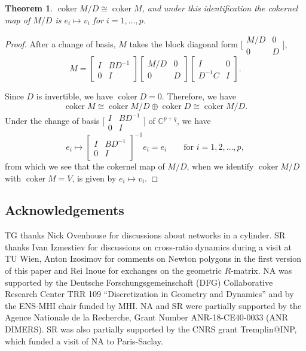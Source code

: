 \documentclass[pdftex]{sigma}
\numberwithin{equation}{section}
\newtheorem{Theorem}{Theorem}[section]
\newcommand{\C}{{\mathbb C}}
\newcommand{\la}{\label}
\DeclareMathOperator{\coker}{coker}
\begin{document}
		\begin{Theorem}\la{thm::schur}
			$\coker M/D \cong \coker M$, and under this identification the cokernel map of $M/D$ is $e_i \mapsto v_i$ for $i=1,\dots,p$.
		\end{Theorem}
		\begin{proof}
			After a change of basis, $M$ takes the block diagonal form $\bigl[\begin{smallmatrix} M/D &0\\ 0&D \end{smallmatrix}\bigr]$,
			\[
			M=\begin{bmatrix}
				I & B D^{-1}\\
				0 & I
			\end{bmatrix}
			\begin{bmatrix} M/D &0\\ 0&D \end{bmatrix}
			\begin{bmatrix}
				I & 0\\
				D^{-1}C & I
			\end{bmatrix}.
			\]
			
			Since $D$ is invertible, we have $\coker D=0$. Therefore, we have
			\[
			\coker M \cong \coker M/D \oplus \coker D \cong \coker M/D.
			\]
			Under the change of basis $\big[\begin{smallmatrix}
				I & B D^{-1}\\
				0 & I
			\end{smallmatrix}\bigr]$ of $\C^{p+q}$, we have
			\[
			e_i \mapsto \begin{bmatrix}
				I & B D^{-1}\\
				0 & I
			\end{bmatrix}^{-1} e_i = e_i\qquad \text{for }i =1,2,\dots,p,
			\]
			from which we see that the cokernel map of $M/D$, when we identify $\coker M/D$ with ${\coker M\!=\!V}$, is given by $e_i \mapsto v_i$.
		\end{proof}


\subsection*{Acknowledgements}

TG thanks Nick Ovenhouse for discussions about networks in a cylinder. SR thanks Ivan Izmestiev for discussions on cross-ratio dynamics during a visit at TU Wien, Anton Izosimov for comments on Newton polygons in the first version of this paper and Rei Inoue for exchanges on the geometric $R$-matrix. NA was supported by the Deutsche Forschungsgemeinschaft (DFG) Collaborative Research Center TRR 109 ``Discretization in Geometry and Dynamics'' and by the ENS-MHI chair funded by MHI. NA and SR were partially supported by the Agence Nationale de la Recherche, Grant Number ANR-18-CE40-0033 (ANR DIMERS). SR was also partially supported by the CNRS grant Tremplin@INP, which funded a visit of NA to Paris-Saclay.
\end{document}
